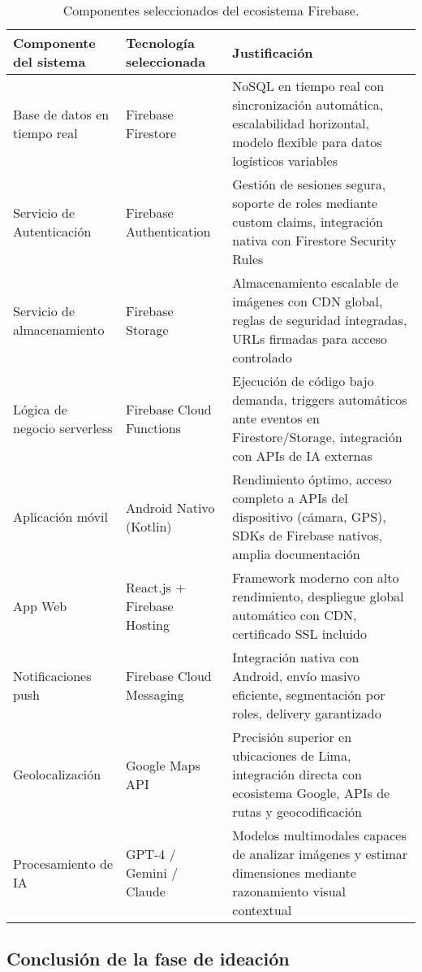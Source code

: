 \begin{table}[H]
\centering
\caption{Componentes seleccionados del ecosistema Firebase.}
\label{tab:componentes_firebase}
\begin{tabular}{@{}p{3.5cm}p{3.5cm}p{6cm}@{}}
\toprule
\textbf{Componente del sistema} & \textbf{Tecnología seleccionada} & \textbf{Justificación} \\
\midrule
Base de datos en tiempo real & Firebase Firestore & NoSQL en tiempo real con sincronización automática, escalabilidad horizontal, modelo flexible para datos logísticos variables \\
\midrule
Servicio de Autenticación & Firebase Authentication & Gestión de sesiones segura, soporte de roles mediante custom claims, integración nativa con Firestore Security Rules \\
\midrule
Servicio de almacenamiento & Firebase Storage & Almacenamiento escalable de imágenes con CDN global, reglas de seguridad integradas, URLs firmadas para acceso controlado \\
\midrule
Lógica de negocio serverless & Firebase Cloud Functions & Ejecución de código bajo demanda, triggers automáticos ante eventos en Firestore/Storage, integración con APIs de IA externas \\
\midrule
Aplicación móvil & Android Nativo (Kotlin) & Rendimiento óptimo, acceso completo a APIs del dispositivo (cámara, GPS), SDKs de Firebase nativos, amplia documentación \\
\midrule
App Web & React.js + Firebase Hosting & Framework moderno con alto rendimiento, despliegue global automático con CDN, certificado SSL incluido \\
\midrule
Notificaciones push & Firebase Cloud Messaging & Integración nativa con Android, envío masivo eficiente, segmentación por roles, delivery garantizado \\
\midrule
Geolocalización & Google Maps API & Precisión superior en ubicaciones de Lima, integración directa con ecosistema Google, APIs de rutas y geocodificación \\
\midrule
Procesamiento de IA & GPT-4 / Gemini / Claude & Modelos multimodales capaces de analizar imágenes y estimar dimensiones mediante razonamiento visual contextual \\
\bottomrule
\end{tabular}
\end{table}

\subsection{Conclusión de la fase de ideación}

